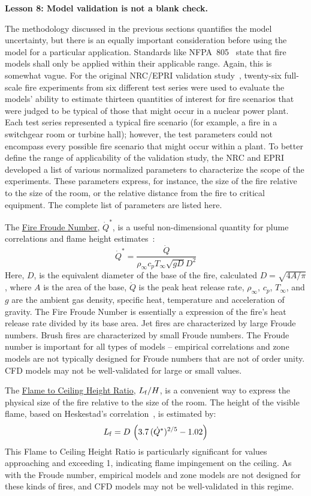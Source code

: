 \documentclass[fleqn,b5paper]{article}
\begin{document}
\vspace{\parskip}
{\bf Lesson 8: Model validation is not a blank check.}

The methodology discussed in the previous sections quantifies the model uncertainty, but there is an equally important consideration before using the model for a particular application. Standards like NFPA~805~\cite{NFPA_805} state that fire models shall only be applied within their applicable range. Again, this is somewhat vague. For the original NRC/EPRI validation study~\cite{NUREG_1824}, twenty-six full-scale fire experiments from six different test series were used to evaluate the models' ability to estimate thirteen quantities of interest for fire scenarios that were judged to be typical of those that might occur in a nuclear power plant. Each test series represented a typical fire scenario (for example, a fire in a switchgear room or turbine hall); however, the test parameters could not encompass every possible fire scenario that might occur within a plant. To better define the range of applicability of the validation study, the NRC and EPRI developed a list of various normalized parameters to characterize the scope of the experiments. These parameters express, for instance, the size of the fire relative to the size of the room, or the relative distance from the fire to critical equipment. The complete list of parameters are listed here.

The \underline{Fire Froude Number}, $\dot{Q}^*$, is a useful non-dimensional quantity for plume correlations and flame height estimates~\cite{SFPE:Heskestad}:
\begin{equation}
   \dot{Q}^* = \frac{\dot{Q}}{\rho_\infty c_p T_\infty \sqrt{gD} D^2}
\end{equation}
Here, $D$, is the equivalent diameter of the base of the fire, calculated $D=\sqrt{4A/\pi}$, where $A$ is the area of the base, $\dot{Q}$ is the peak heat release rate, $\rho_\infty$, $c_p$, $T_\infty$, and $g$ are the ambient gas density, specific heat, temperature and acceleration of gravity. The Fire Froude Number is essentially a expression of the fire's heat release rate divided by its base area. Jet fires are characterized by large Froude numbers. Brush fires are characterized by small Froude numbers. The Froude number is important for all types of models -- empirical correlations and zone models are not typically designed for Froude numbers that are not of order unity. CFD models may not be well-validated for large or small values.

The \underline{Flame to Ceiling Height Ratio}, $L_{\rm f}/H$, is a convenient way to express the physical size of the fire relative to the size of the room. The height of the visible flame, based on Heskestad's correlation~\cite{SFPE:Heskestad}, is estimated by:
\begin{equation}
   L_{\rm f} = D \, \left( 3.7 \, (\dot{Q}^*)^{2/5} - 1.02 \right)
\end{equation}
This Flame to Ceiling Height Ratio is particularly significant for values approaching and exceeding 1, indicating flame impingement on the ceiling. As with the Froude number, empirical models and zone models are not designed for these kinds of fires, and CFD models may not be well-validated in this regime.
\end{document}
